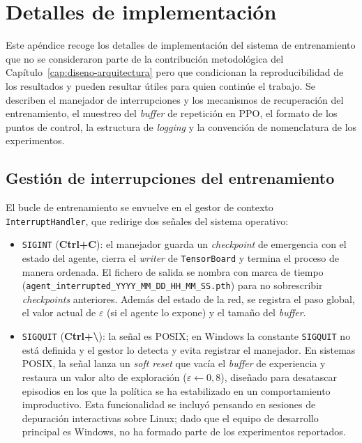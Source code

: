 \chapter{Detalles de implementación}\label{apendice:implementacion}

Este apéndice recoge los detalles de implementación del sistema de
entrenamiento que no se consideraron parte de la contribución
metodológica del Capítulo~\ref{cap:diseno-arquitectura} pero que
condicionan la reproducibilidad de los resultados y pueden resultar
útiles para quien continúe el trabajo. Se describen el manejador de
interrupciones y los mecanismos de recuperación del entrenamiento, el
muestreo del \textit{buffer} de repetición en PPO, el formato de los
puntos de control, la estructura de \textit{logging} y la convención de
nomenclatura de los experimentos.

\section{Gestión de interrupciones del entrenamiento}\label{apendice:interrupciones}
El bucle de entrenamiento se envuelve en el gestor de contexto
\texttt{InterruptHandler}, que redirige dos señales del sistema
operativo:

\begin{itemize}
    \item \texttt{SIGINT} (\textbf{Ctrl+C}): el manejador guarda un
    \textit{checkpoint} de emergencia con el estado del agente, cierra
    el \textit{writer} de \texttt{TensorBoard} y termina el proceso de
    manera ordenada. El fichero de salida se nombra con marca de tiempo
    (\texttt{agent\_interrupted\_YYYY\_MM\_DD\_HH\_MM\_SS.pth}) para no
    sobrescribir \textit{checkpoints} anteriores. Además del estado de
    la red, se registra el paso global, el valor actual de
    $\varepsilon$ (si el agente lo expone) y el tamaño del
    \textit{buffer}.

    \item \texttt{SIGQUIT} (\textbf{Ctrl+\textbackslash}): la señal es
    POSIX; en Windows la constante \texttt{SIGQUIT} no está definida y
    el gestor lo detecta y evita registrar el manejador. En sistemas
    POSIX, la señal lanza un \textit{soft reset} que vacía el
    \textit{buffer} de experiencia y restaura un valor alto de
    exploración ($\varepsilon \leftarrow 0{,}8$), diseñado para
    desatascar episodios en los que la política se ha estabilizado en
    un comportamiento improductivo. Esta funcionalidad se incluyó
    pensando en sesiones de depuración interactivas sobre Linux; dado
    que el equipo de desarrollo principal es Windows, no ha formado
    parte de los experimentos reportados.
\end{itemize}

